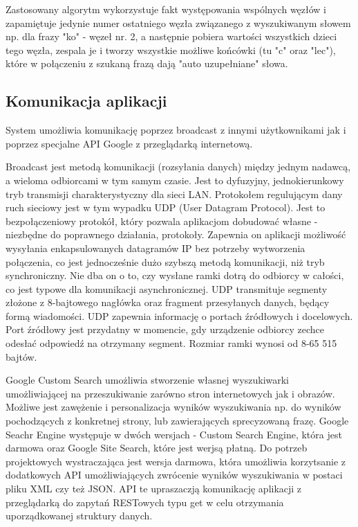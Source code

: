\documentclass[twoside,a4paper]{book}
\begin{document}
Zastosowany algorytm wykorzystuje fakt występowania wspólnych węzłów i zapamiętuje jedynie numer ostatniego węzła związanego z wyszukiwanym słowem np. dla frazy "ko" - węzeł nr. 2, a następnie pobiera wartości wszystkich dzieci tego węzła, zespala je i tworzy wszystkie możliwe końcówki (tu "c" oraz "lec"), które w połączeniu z szukaną frazą dają "auto uzupełniane" słowa.
\subsection{Komunikacja aplikacji}
System umożliwia komunikację poprzez broadcast z innymi użytkownikami jak i poprzez specjalne API Google z przeglądarką internetową. 

Broadcast jest metodą komunikacji (rozsyłania danych) między jednym nadawcą, a wieloma odbiorcami w tym samym czasie. Jest to dyfuzyjny, jednokierunkowy tryb  transmisji charakterystyczny dla sieci LAN. Protokołem regulującym dany ruch sieciowy jest w tym wypadku UDP (User Datagram Protocol). Jest to bezpołączeniowy protokół, który pozwala aplikacjom dobudować własne - niezbędne do poprawnego działania, protokoły. 
Zapewnia on aplikacji możliwość wysyłania enkapsulowanych datagramów IP bez potrzeby wytworzenia połączenia, co jest jednocześnie dużo szybszą metodą komunikacji, niż tryb synchroniczny. Nie dba on o to, czy wysłane ramki dotrą do odbiorcy w całości, co jest typowe dla komunikacji asynchronicznej.
UDP transmituje segmenty złożone z 8-bajtowego nagłówka oraz fragment przesyłanych danych, będący formą wiadomości. 
UDP zapewnia informację o portach źródłowych i docelowych. 
Port źródłowy jest przydatny w momencie, gdy urządzenie odbiorcy zechce odesłać odpowiedź na otrzymany segment.
Rozmiar ramki wynosi od 8-65 515 bajtów. ~\cite{UDP}

Google Custom Search umożliwia stworzenie własnej wyszukiwarki umożliwiającej na przeszukiwanie zarówno stron internetowych jak i obrazów. Możliwe jest zawężenie i personalizacja wyników wyszukiwania np. do wyników pochodzących z konkretnej strony, lub zawierających sprecyzowaną frazę.  Google Seachr Engine występuje w dwóch wersjach - Custom Search Engine, która jest darmowa oraz Google Site Search, które jest werjsą płatną. Do potrzeb projektowych wystraczająca jest wersja darmowa, która umożliwia korzytsanie z dodatkowych API umożliwiających zwrócenie wyników wyszukiwania w postaci pliku XML czy też JSON. API te upraszaczją komunikację aplikacji z przeglądarką do zapytań RESTowych typu get w celu otrzymania uporządkowanej struktury danych. ~\cite{googleAPI}
\end{document}
